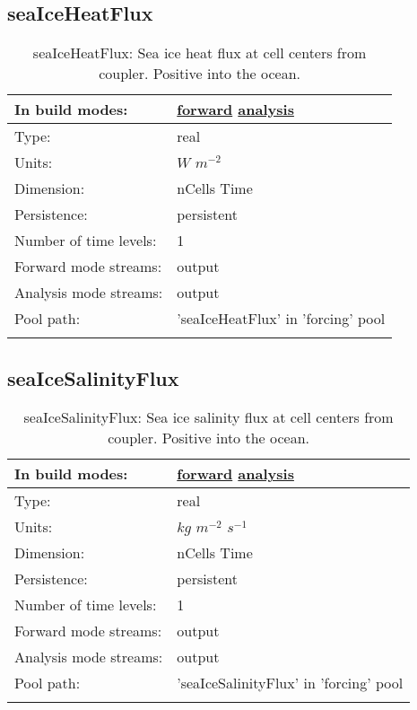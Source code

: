 \subsection[seaIceHeatFlux]{seaIceHeatFlux}
\label{subsec:var_sec_forcing_seaIceHeatFlux}
\begin{center}
\begin{longtable}{| p{2.0in} | p{4.0in} |}
        \hline 
        In build modes: & \hyperref[subsec:forward_var_tab_forcing]{forward} \hyperref[subsec:analysis_var_tab_forcing]{analysis} \\
        \hline 
        Type: & real \\
        \hline 
        Units: & $W$ $m^{-2}$ \\
        \hline 
        Dimension: & nCells Time \\
        \hline 
        Persistence: & persistent \\
        \hline 
        Number of time levels: & 1 \\
        \hline 
		 Forward mode streams: &  output \\
        \hline 
		 Analysis mode streams: &  output \\
        \hline 
            Pool path: & 'seaIceHeatFlux' in 'forcing' pool
 \\
		 \hline 
    \caption{seaIceHeatFlux: Sea ice heat flux at cell centers from coupler. Positive into the ocean.}
\end{longtable}
\end{center}
\subsection[seaIceSalinityFlux]{seaIceSalinityFlux}
\label{subsec:var_sec_forcing_seaIceSalinityFlux}
\begin{center}
\begin{longtable}{| p{2.0in} | p{4.0in} |}
        \hline 
        In build modes: & \hyperref[subsec:forward_var_tab_forcing]{forward} \hyperref[subsec:analysis_var_tab_forcing]{analysis} \\
        \hline 
        Type: & real \\
        \hline 
        Units: & $kg$ $m^{-2}$ $s^{-1}$ \\
        \hline 
        Dimension: & nCells Time \\
        \hline 
        Persistence: & persistent \\
        \hline 
        Number of time levels: & 1 \\
        \hline 
		 Forward mode streams: &  output \\
        \hline 
		 Analysis mode streams: &  output \\
        \hline 
            Pool path: & 'seaIceSalinityFlux' in 'forcing' pool
 \\
		 \hline 
    \caption{seaIceSalinityFlux: Sea ice salinity flux at cell centers from coupler. Positive into the ocean.}
\end{longtable}
\end{center}

